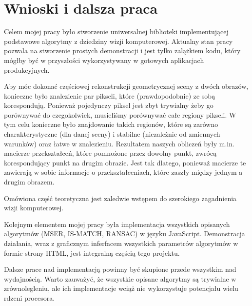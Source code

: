\chapter{Wnioski i dalsza praca}

Celem mojej pracy było stworzenie uniwersalnej biblioteki implementującej
podstawowe algorytmy z dziedziny wizji komputerowej. Aktualny stan pracy
pozwala na stworzenie prostych demonstracji i jest tylko zalążkiem kodu, który
mógłby być w przyszłości wykorzystywany w gotowych aplikacjach produkcyjnych.

Aby móc dokonać częściowej rekonstrukcji geometrycznej sceny z dwóch obrazów,
konieczne było znalezienie par pikseli, które (prawdopodobnie) ze sobą
korespondują. Ponieważ pojedynczy piksel jest zbyt trywialny żeby go porównywać
do czegokolwiek, musieliśmy porównywać całe regiony pikseli. W tym celu
konieczne było znajdowanie takich regionów, które są zarówno charakterystyczne
(dla danej sceny) i stabilne (niezależnie od zmiennych warunków) oraz łatwe w
znalezieniu. Rezultatem naszych obliczeń były m.in. macierze przekształceń, które
pomnożone przez dowolny punkt, zwrócą korespondujący punkt na drugim obrazie.
Jest tak dlatego, ponieważ macierze te zawierają w sobie informacje o
przekształceniach, które zaszły między jednym a drugim obrazem.

Omówiona część teoretyczna jest zaledwie wstępem do szerokiego zagadnienia
wizji komputerowej.

Kolejnym elementem mojej pracy była implementacja wszystkich opisanych
algorytmów (MSER, IS-MATCH, RANSAC) w języku JavaScript. Demonstracja działania,
wraz z graficznym inferfacem wszystkich parametrów algorytmów w formie strony
HTML, jest integralną częścią tego projektu. 

Dalsze prace nad implementacją powinny być skupione przede wszystkim nad
wydajnością. Warto zauważyć, że wszystkie opisane algorytmy są trywialne w
zrównolegleniu, ale ich implementacje wciąż nie wykorzystuje potencjału wielu
rdzeni procesora.
